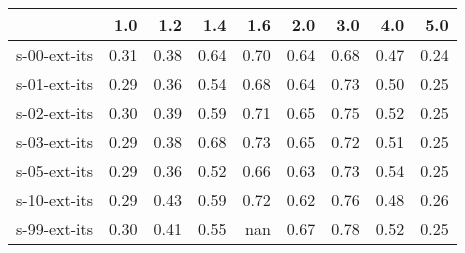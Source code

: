 \begin{tabular}{lrrrrrrrr}
\toprule
{} &  1.0 &  1.2 &  1.4 &  1.6 &  2.0 &  3.0 &  4.0 &  5.0 \\
\midrule
s-00-ext-its & 0.31 & 0.38 & 0.64 & 0.70 & 0.64 & 0.68 & 0.47 & 0.24 \\
s-01-ext-its & 0.29 & 0.36 & 0.54 & 0.68 & 0.64 & 0.73 & 0.50 & 0.25 \\
s-02-ext-its & 0.30 & 0.39 & 0.59 & 0.71 & 0.65 & 0.75 & 0.52 & 0.25 \\
s-03-ext-its & 0.29 & 0.38 & 0.68 & 0.73 & 0.65 & 0.72 & 0.51 & 0.25 \\
s-05-ext-its & 0.29 & 0.36 & 0.52 & 0.66 & 0.63 & 0.73 & 0.54 & 0.25 \\
s-10-ext-its & 0.29 & 0.43 & 0.59 & 0.72 & 0.62 & 0.76 & 0.48 & 0.26 \\
s-99-ext-its & 0.30 & 0.41 & 0.55 &  nan & 0.67 & 0.78 & 0.52 & 0.25 \\
\bottomrule
\end{tabular}
